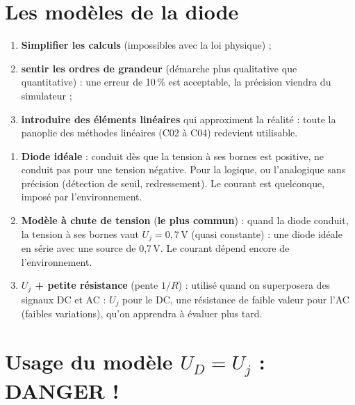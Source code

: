 \section{Les modèles de la diode}


\begin{propbox}[title=Justification des modèles]
\begin{enumerate}
  \item \textbf{Simplifier les calculs} (impossibles avec la loi physique) ;
  \item \textbf{sentir les ordres de grandeur} (démarche plus qualitative que
        quantitative) : une erreur de 10\,\% est acceptable, la précision viendra du
        simulateur ;
  \item \textbf{introduire des éléments linéaires} qui approximent la réalité : toute la
        panoplie des méthodes linéaires (C02 à C04) redevient utilisable.
\end{enumerate}
\end{propbox}


\begin{thmbox}[title=Trois modèles de la diode]
\begin{enumerate}
  \item \textbf{Diode idéale} : conduit dès que la tension à ses bornes est positive, ne
        conduit pas pour une tension négative. Pour la logique, ou l'analogique sans
        précision (détection de seuil, redressement). Le courant est quelconque, imposé par
        l'environnement.
  \item \textbf{Modèle à chute de tension} (\textbf{le plus commun}) : quand la diode conduit,
        la tension à ses bornes vaut $U_j = 0{,}7$\,V (quasi constante) : une diode idéale en
        série avec une source de 0,7\,V. Le courant dépend encore de l'environnement.
  \item \textbf{$U_j$ + petite résistance} (pente $1/R$) : utilisé quand on superposera des
        signaux DC et AC : $U_j$ pour le DC, une résistance de faible valeur pour l'AC (faibles
        variations), qu'on apprendra à évaluer plus tard.
\end{enumerate}
\end{thmbox}

\section{Usage du modèle $U_D = U_j$ : DANGER !}

